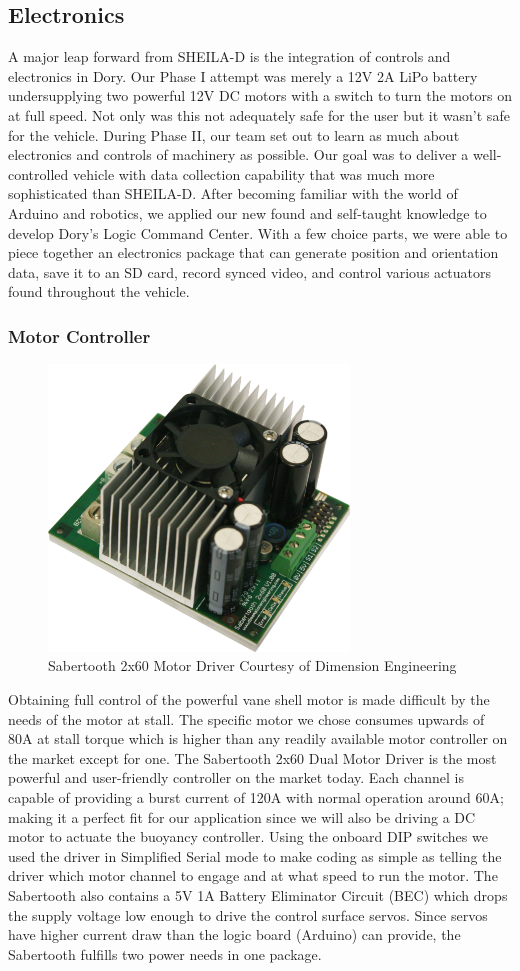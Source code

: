 \documentclass{report}
\begin{document}
\subsection{Electronics}
A major leap forward from SHEILA-D is the integration of controls and electronics in Dory.  Our Phase I attempt was merely a 12V 2A LiPo battery undersupplying two powerful 12V DC motors with a switch to turn the motors on at full speed.  Not only was this not adequately safe for the user but it wasn’t safe for the vehicle.  During Phase II, our team set out to learn as much about electronics and controls of machinery as possible.  Our goal was to deliver a well-controlled vehicle with data collection capability that was much more sophisticated than SHEILA-D.    After becoming familiar with the world of Arduino and robotics, we applied our new found and self-taught knowledge to develop Dory’s Logic Command Center.  With a few choice parts, we were able to piece together an electronics package that can generate position and orientation data, save it to an SD card, record synced video, and control various actuators found throughout the vehicle.  
\subsubsection{Motor Controller}
\begin{figure}[H]
\centering
\includegraphics[width=8cm]{"sabertooth"}
\caption{Sabertooth 2x60 Motor Driver Courtesy of Dimension Engineering}
\end{figure}
Obtaining full control of the powerful vane shell motor is made difficult by the needs of the motor at stall.  The specific motor we chose consumes upwards of 80A at stall torque which is higher than any readily available motor controller on the market except for one.  The Sabertooth 2x60 Dual Motor Driver is the most powerful and user-friendly controller on the market today.  Each channel is capable of providing a burst current of 120A with normal operation around 60A; making it a perfect fit for our application since we will also be driving a DC motor to actuate the buoyancy controller.  Using the onboard DIP switches we used the driver in Simplified Serial mode to make coding as simple as telling the driver which motor channel to engage and at what speed to run the motor.  The Sabertooth also contains a 5V 1A Battery Eliminator Circuit (BEC) which drops the supply voltage low enough to drive the control surface servos.  Since servos have higher current draw than the logic board (Arduino) can provide, the Sabertooth fulfills two power needs in one package.
\end{document}
